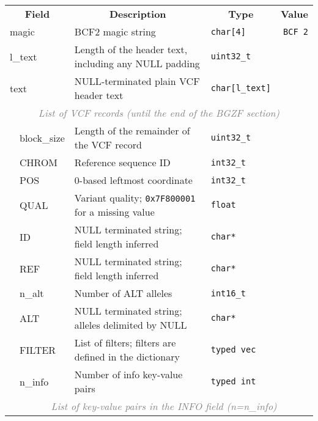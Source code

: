 \documentclass[10pt]{article}
\begin{document}
\begin{table}[ht]
\centering
{\small
\begin{tabular}{|l|l|l|p{8.2cm}|l|r|}
  \cline{1-6}
  \multicolumn{3}{|c|}{\bf Field} & \multicolumn{1}{c|}{\bf Description} & \multicolumn{1}{c|}{\bf Type} & \multicolumn{1}{c|}{\bf Value} \\\cline{1-6}
  \multicolumn{3}{|l|}{\sf magic} & BCF2 magic string & {\tt char[4]} & {\tt BCF\char92 2}\\\cline{1-6}
  \multicolumn{3}{|l|}{\sf l\_text} & Length of the header text, including any {\sf NULL} padding & {\tt uint32\_t} & \\\cline{1-6}
  \multicolumn{3}{|l|}{\sf text} & {\sf NULL}-terminated plain VCF header text & {\tt char[{\sf l\_text}]} & \\\cline{1-6}
  \multicolumn{6}{|c|}{\textcolor{gray}{\it List of VCF records (until the end of the BGZF section)}} \\\cline{2-6}
  & \multicolumn{2}{l|}{\sf block\_size} & Length of the remainder of the VCF record & {\tt uint32\_t} & \\\cline{2-6}
  & \multicolumn{2}{l|}{\sf CHROM} & Reference sequence ID & {\tt int32\_t} & \\\cline{2-6}
  & \multicolumn{2}{l|}{\sf POS} & 0-based leftmost coordinate & {\tt int32\_t} & \\\cline{2-6}
  & \multicolumn{2}{l|}{\sf QUAL} & Variant quality; {\tt 0x7F800001} for a missing value & {\tt float} & \\\cline{2-6}
  & \multicolumn{2}{l|}{\sf ID} & {\sf NULL} terminated string; field length inferred & {\tt char*} & \\\cline{2-6}
  & \multicolumn{2}{l|}{\sf REF} & {\sf NULL} terminated string; field length inferred & {\tt char*} & \\\cline{2-6}
  & \multicolumn{2}{l|}{\sf n\_alt} & Number of {\sf ALT} alleles & {\tt int16\_t} & \\\cline{2-6}
  & \multicolumn{2}{l|}{\sf ALT} & {\sf NULL} terminated string; alleles delimited by {\sf NULL} & {\tt char*} & \\\cline{2-6}
  & \multicolumn{2}{l|}{\sf FILTER} & List of filters; filters are defined in the dictionary & {\tt typed vec} & \\\cline{2-6}
  & \multicolumn{2}{l|}{\sf n\_info} & Number of info key-value pairs & {\tt typed int} & \\\cline{2-6}
  & \multicolumn{5}{c|}{\textcolor{gray}{\it List of key-value pairs in the INFO field (n=n\_info)}} \\\cline{3-6}

\end{tabular}}
\end{table}
\end{document}
